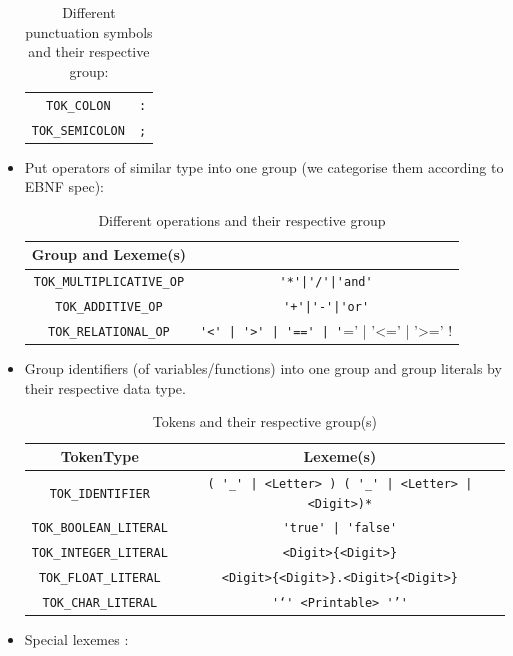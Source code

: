\begin{itemize}
\begin{table}[H]
\begin{tabular}{c|c}
            \verb!TOK_COLON! & \verb!:! \\
            \verb!TOK_SEMICOLON! & \verb!;! \\
        \end{tabular}
        \caption{Different punctuation symbols and their respective group:}
        \label{tab:punctuation lexemes}
    \end{table}
    \item Put operators of similar type into one group (we categorise them according to EBNF spec): 
    \begin{table}[H]
    \small
    \centering
    \begin{tabular}{c|c}
        Group and Lexeme(s) \\
        \hline
        \verb!TOK_MULTIPLICATIVE_OP! & \verb!'*'|'/'|'and'! \\
        \verb!TOK_ADDITIVE_OP! & \verb!'+'|'-'|'or'! \\
        \verb!TOK_RELATIONAL_OP! & \verb!'<' | '>' | '==' | '!=' | '<=' | '>=' ! \\
    \end{tabular}
      \caption{Different operations and their respective group}
    \label{tab:operation lexemes}
    \end{table}
    \item Group identifiers (of variables/functions) into one group and group literals by their respective data type. 
        \begin{table}[H]
        \small
        \centering
        \begin{tabular}{c|c}
        TokenType & Lexeme(s) \\
        \hline 
           \verb!TOK_IDENTIFIER!  & \verb!( '_' | <Letter> ) ( '_' | <Letter> | <Digit>)*!  \\
           \verb!TOK_BOOLEAN_LITERAL! & \verb!'true' | 'false'!  \\
           \verb!TOK_INTEGER_LITERAL! & \verb!<Digit>{<Digit>}! \\
           \verb!TOK_FLOAT_LITERAL! & \verb!<Digit>{<Digit>}.<Digit>{<Digit>}! \\
           \verb!TOK_CHAR_LITERAL! & \verb!'‘' <Printable> '’'! \\
        \end{tabular}
        \caption{Tokens and their respective group(s)}
        \label{tab:identifier literals lexemes}
    \end{table}
    \item Special lexemes : 

\end{itemize}
